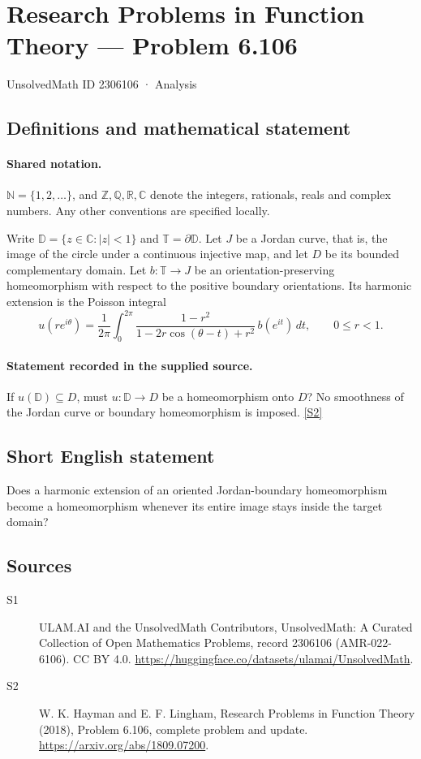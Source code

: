 \documentclass[11pt]{article}
\newcommand{\sref}[2]{\hyperlink{source:#1:#2}{[S#2]}}
\begin{document}
\setcounter{section}{2306105}
\section{Research Problems in Function Theory — Problem 6.106}\label{2306106}
{\small\sffamily UnsolvedMath ID 2306106 · Analysis}
\subsection{Definitions and mathematical statement}

\paragraph{Shared notation.}$\mathbb N=\{1,2,\ldots\}$, and $\mathbb Z,\mathbb Q,\mathbb R,\mathbb C$ denote the integers, rationals, reals and complex numbers. Any other conventions are specified locally.


Write $\mathbb D=\{z\in\mathbb C:|z|<1\}$ and $\mathbb T=\partial\mathbb D$. Let $J$ be a Jordan curve, that is, the image of the circle under a continuous injective map, and let $D$ be its bounded complementary domain. Let $b:\mathbb T\to J$ be an orientation-preserving homeomorphism with respect to the positive boundary orientations. Its harmonic extension is the Poisson integral
\[u(re^{i\theta})=\frac1{2\pi}\int_0^{2\pi}
\frac{1-r^2}{1-2r\cos(\theta-t)+r^2}\,b(e^{it})\,dt,\qquad0\leq r<1.\]
\paragraph{Statement recorded in the supplied source.}
If $u(\mathbb D)\subseteq D$, must $u:\mathbb D\to D$ be a homeomorphism onto $D$? No smoothness of the Jordan curve or boundary homeomorphism is imposed. \sref{2306106}{2}
\subsection{Short English statement}
Does a harmonic extension of an oriented Jordan-boundary homeomorphism become a homeomorphism whenever its entire image stays inside the target domain?
\subsection{Sources}
\begin{description}
\item[\hypertarget{source:2306106:1}{S1}] ULAM.AI and the UnsolvedMath Contributors, UnsolvedMath: A Curated Collection of Open Mathematics Problems, record 2306106 (AMR-022-6106). CC BY 4.0. \url{https://huggingface.co/datasets/ulamai/UnsolvedMath}.
\item[\hypertarget{source:2306106:2}{S2}] W. K. Hayman and E. F. Lingham, Research Problems in Function Theory (2018), Problem 6.106, complete problem and update. \url{https://arxiv.org/abs/1809.07200}.
\end{description}
\label{end:2306106}
\end{document}
